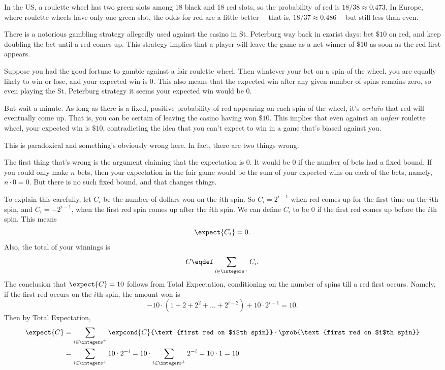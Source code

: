 In the US, a roulette wheel has two green slots among 18 black and 18 red
slots, so the probability of red is $18/38 \approx 0.473$.  In
Europe, where roulette wheels have only one green slot, the odds for red
are a little better ---that is, $18/37 \approx 0.486$ ---but still less
than even.

There is a notorious gambling strategy allegedly used against the
casino in St. Peterburg way back in czarist days: bet $\$10$ on red,
and keep doubling the bet until a red comes up.  This strategy implies
that a player will leave the game as a net winner of $\$10$ as soon as
the red first appears.

Suppose you had the good fortune to gamble against a fair roulette
wheel.  Then whatever your bet on a spin of the wheel, you are equally
likely to win or lose, and your expected win is 0.  This also means
that the expected win after any given number of spins remains zero, so
even playing the St. Peterburg strategy it seems your expected win
would be 0.

But wait a minute.  As long as there is a fixed, positive probability
of red appearing on each spin of the wheel, it's \emph{certain} that
red will eventually come up.  That is, you can be certain of leaving
the casino having won $\$10$.  This implies that even against an
\emph{unfair} roulette wheel, your expected win is $\$10$,
contradicting the idea that you can't expect to win in a game that's
biased against you.

This is paradoxical and something's obviously wrong here.  In fact,
there are two things wrong.

The first thing that's wrong is the argument claiming that the
expectation is 0.  It would be 0 if the number of bets had a fixed
bound.  If you could only make $n$ bets, then your expectation in the
fair game would be the sum of your expected wins on each of the bets,
namely, $n \cdot 0 = 0$.  But there is no such fixed bound, and that
changes things.

To explain this carefully, let $C_i$ be the number of dollars won on
the $i$th spin.  So $C_i = 2^{i-1}$ when red comes up for the first time
on the $i$th spin, and $C_i = -2^{i-1}$, when the first red spin comes up
after the $i$th spin.  We can define $C_i$ to be 0 if the first red
comes up before the $i$th spin.  This means
\[
\expect{C_i} = 0.
\]
Also, the total of your winnings is 
\[
C \eqdef \sum_{i \in \integers^+} C_i.
\]
The conclusion that $\expect{C} = 10$ follows from Total
Expectation, conditioning on the number of spins till a red first
occurs.  Namely, if the first red occurs on the $i$th spin, the amount
won is
\[
-10 \cdot (1 + 2 + 2^2 + \dots + 2^{i - 2}) + 10 \cdot 2^{i-1}   = 10.
\]
Then by Total Expectation,
\begin{align*}
\expect{C}
  & = \sum_{i  \in \integers^+}
      \expcond{C}{\text{first red on $i$th spin}}
      \cdot \prob{\text{first red on $i$th spin}}\\
  & = \sum_{i  \in \integers^+} 10 \cdot 2^{-i}
    = 10 \cdot \sum_{i  \in \integers^+} 2^{-i} = 10 \cdot 1 = 10.
\end{align*}

